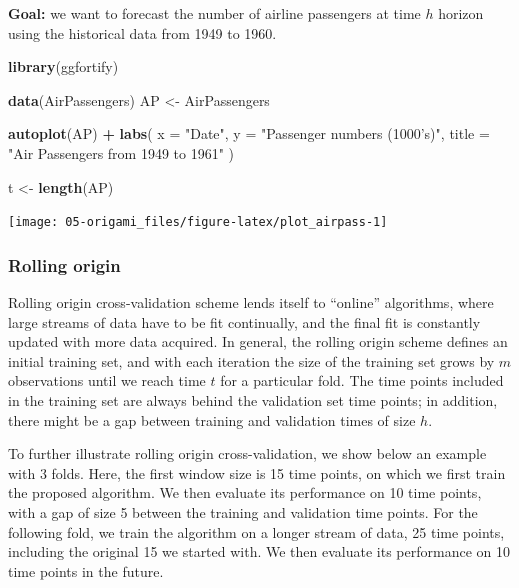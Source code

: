 \documentclass[12pt, krantz2,]{book}
\newenvironment{Shaded}{\begin{snugshade}}{\end{snugshade}}
\newcommand{\DataTypeTok}[1]{\textcolor[rgb]{0.13,0.29,0.53}{#1}}
\newcommand{\KeywordTok}[1]{\textcolor[rgb]{0.13,0.29,0.53}{\textbf{#1}}}
\newcommand{\NormalTok}[1]{#1}
\newcommand{\OperatorTok}[1]{\textcolor[rgb]{0.81,0.36,0.00}{\textbf{#1}}}
\newcommand{\StringTok}[1]{\textcolor[rgb]{0.31,0.60,0.02}{#1}}
\theoremstyle{definition}
\theoremstyle{definition}
\theoremstyle{definition}
\newcommand{\1}{\mathbbm{1}}
\begin{document}
\textbf{Goal:} we want to forecast the number of airline passengers at time \(h\)
horizon using the historical data from 1949 to 1960.

\begin{Shaded}
\begin{Highlighting}[]
\KeywordTok{library}\NormalTok{(ggfortify)}

\KeywordTok{data}\NormalTok{(AirPassengers)}
\NormalTok{AP <-}\StringTok{ }\NormalTok{AirPassengers}

\KeywordTok{autoplot}\NormalTok{(AP) }\OperatorTok{+}
\StringTok{  }\KeywordTok{labs}\NormalTok{(}
    \DataTypeTok{x =} \StringTok{"Date"}\NormalTok{,}
    \DataTypeTok{y =} \StringTok{"Passenger numbers (1000's)"}\NormalTok{,}
    \DataTypeTok{title =} \StringTok{"Air Passengers from 1949 to 1961"}
\NormalTok{  )}

\NormalTok{t <-}\StringTok{ }\KeywordTok{length}\NormalTok{(AP)}
\end{Highlighting}
\end{Shaded}

\begin{center}\texttt{[image: 05-origami\_files/figure-latex/plot\_airpass-1]} \end{center}

\hypertarget{rolling-origin}{%
\subsubsection{Rolling origin}\label{rolling-origin}}

Rolling origin cross-validation scheme lends itself to ``online'' algorithms,
where large streams of data have to be fit continually, and the final fit is
constantly updated with more data acquired. In general, the rolling origin
scheme defines an initial training set, and with each iteration the size of the
training set grows by \(m\) observations until we reach time \(t\) for a particular
fold. The time points included in the training set are always behind the
validation set time points; in addition, there might be a gap between training
and validation times of size \(h\).

To further illustrate rolling origin cross-validation, we show below an example
with 3 folds. Here, the first window size is 15 time points, on which we first
train the proposed algorithm. We then evaluate its performance on 10 time
points, with a gap of size 5 between the training and validation time points.
For the following fold, we train the algorithm on a longer stream of data, 25
time points, including the original 15 we started with. We then evaluate its
performance on 10 time points in the future.
\end{document}
